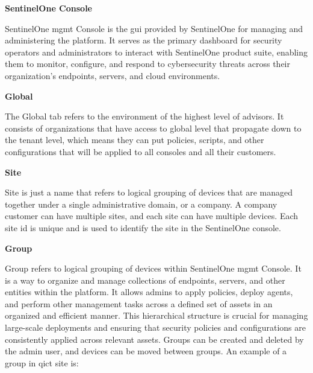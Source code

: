 


\textbf{SentinelOne Console}

SentinelOne \acrshort{mgmt} Console is the \acrshort{gui} provided by SentinelOne for managing and administering the platform. It serves
as the primary dashboard for security operators and administrators to interact with SentinelOne product suite, enabling them to monitor,
configure, and respond to cybersecurity threats across their organization's endpoints, servers, and cloud environments.

\textbf{Global}

The Global tab refers to the environment of the highest level of advisors. It consists of organizations that have access to global level
that propagate down to the tenant level, which means they can put policies, scripts, and other configurations that will be applied to all
consoles and all their customers.

\textbf{Site}

Site is just a name that refers to logical grouping of devices that are managed together under a single administrative domain, or a company.
A company customer can have multiple sites, and each site can have multiple devices. Each site \acrshort{id} is unique and is used to
identify the site in the SentinelOne console.

\textbf{Group}

Group refers to logical grouping of devices within SentinelOne \acrshort{mgmt} Console.  It is a way to organize and manage collections
of endpoints, servers, and other entities within the platform. It allows admins to apply policies, deploy agents, and perform other
management tasks across a defined set of assets in an organized and efficient manner. This hierarchical structure is crucial for
managing large-scale deployments and ensuring that security policies and configurations are consistently applied across relevant assets.
Groups can be created and deleted by the admin user, and devices can be moved between groups. An example of a group in \acrshort{qict}
site is:

